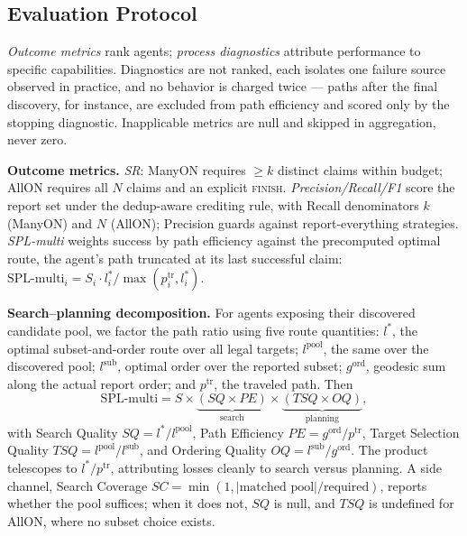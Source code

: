\subsection{Evaluation Protocol}
\label{sec:metrics}

\emph{Outcome metrics} rank agents; \emph{process diagnostics} attribute performance to specific capabilities. Diagnostics are not ranked, each isolates one failure source observed in practice, and no behavior is charged twice — paths after the final discovery, for instance, are excluded from path efficiency and scored only by the stopping diagnostic. Inapplicable metrics are null and skipped in aggregation, never zero.

\textbf{Outcome metrics.}
\emph{SR}: ManyON requires $\geq k$ distinct claims within budget; AllON requires all $N$ claims and an explicit \textsc{finish}. \emph{Precision/Recall/F1} score the report set under the dedup-aware crediting rule, with Recall denominators $k$ (ManyON) and $N$ (AllON); Precision guards against report-everything strategies. \emph{SPL-multi} weights success by path efficiency against the precomputed optimal route, the agent's path truncated at its last successful claim: $\mathrm{SPL\text{-}multi}_i = S_i \cdot l_i^{*} / \max(p_i^{\mathrm{tr}}, l_i^{*})$.

\textbf{Search--planning decomposition.}
For agents exposing their discovered candidate pool, we factor the path ratio using five route quantities: $l^{*}$, the optimal subset-and-order route over all legal targets; $l^{\mathrm{pool}}$, the same over the discovered pool; $l^{\mathrm{sub}}$, optimal order over the reported subset; $g^{\mathrm{ord}}$, geodesic sum along the actual report order; and $p^{\mathrm{tr}}$, the traveled path. Then
\begin{equation}
\mathrm{SPL\text{-}multi} = S \times \underbrace{(SQ \times PE)}_{\text{search}} \times \underbrace{(TSQ \times OQ)}_{\text{planning}},
\end{equation}
with Search Quality $SQ = l^{*}/l^{\mathrm{pool}}$, Path Efficiency $PE = g^{\mathrm{ord}}/p^{\mathrm{tr}}$, Target Selection Quality $TSQ = l^{\mathrm{pool}}/l^{\mathrm{sub}}$, and Ordering Quality $OQ = l^{\mathrm{sub}}/g^{\mathrm{ord}}$. The product telescopes to $l^{*}/p^{\mathrm{tr}}$, attributing losses cleanly to search versus planning. A side channel, Search Coverage $SC = \min(1, |\text{matched pool}|/\text{required})$, reports whether the pool suffices; when it does not, $SQ$ is null, and $TSQ$ is undefined for AllON, where no subset choice exists.

